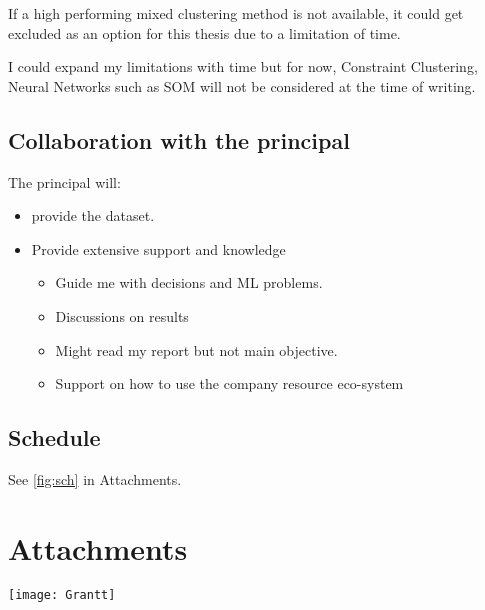 \documentclass[a4paper,11pt]{article}
\begin{document}
If a high performing mixed clustering method is not available, it could get excluded as an option for this thesis due to a limitation of time.

I could expand my limitations with time but for now, Constraint
Clustering, Neural Networks such as SOM will not be considered at the
time of writing.

\subsection{Collaboration with the principal}

The principal will:

\begin{itemize}
\item
  provide the dataset.
\item
  Provide extensive support and knowledge
  \begin{itemize}
    \item
      Guide me with decisions and ML problems.
    \item
      Discussions on results
    \item
      Might read my report but not main objective.
    \item
      Support on how to use the company resource eco-system
  \end{itemize}
\end{itemize}

\subsection{Schedule}
See \ref{fig:sch} in Attachments.

\newpage
\printbibliography[heading=bibintoc]
\newpage

\section*{Attachments}

\newpage
\thispagestyle{plain}
\begin{sidewaysfigure}[h!]
\texttt{[image: Grantt]}
\caption{Preliminary Schedule}
\label{fig:sch}
\end{sidewaysfigure}
\newpage
\end{document}
